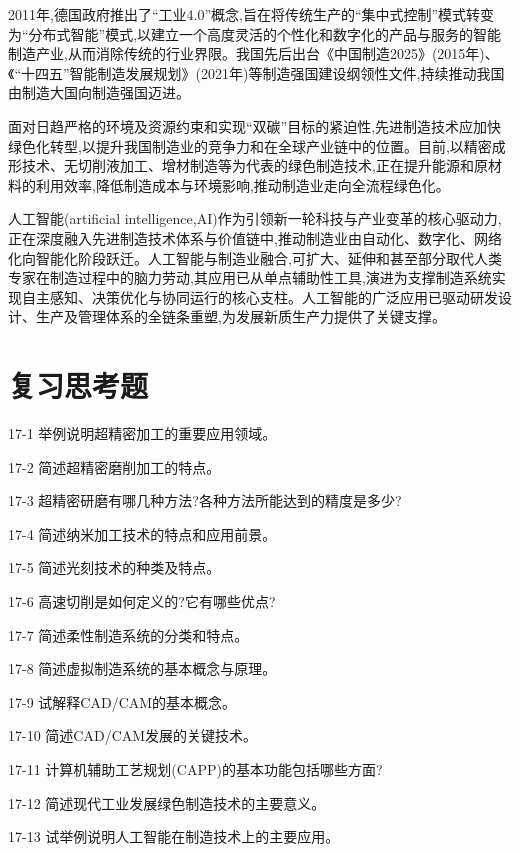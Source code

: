 \documentclass[UTF8]{ctexbook}
\newcommand{\◎}{\ensuremath{\bigcirc}}
\begin{document}
2011年,德国政府推出了“工业4.0”概念,旨在将传统生产的“集中式控制”模式转变为“分布式智能”模式,以建立一个高度灵活的个性化和数字化的产品与服务的智能制造产业,从而消除传统的行业界限。我国先后出台《中国制造2025》(2015年)、《“十四五”智能制造发展规划》(2021年)等制造强国建设纲领性文件,持续推动我国由制造大国向制造强国迈进。

面对日趋严格的环境及资源约束和实现“双碳”目标的紧迫性,先进制造技术应加快绿色化转型,以提升我国制造业的竞争力和在全球产业链中的位置。目前,以精密成形技术、无切削液加工、增材制造等为代表的绿色制造技术,正在提升能源和原材料的利用效率,降低制造成本与环境影响,推动制造业走向全流程绿色化。

人工智能(artificial intelligence,AI)作为引领新一轮科技与产业变革的核心驱动力,正在深度融入先进制造技术体系与价值链中,推动制造业由自动化、数字化、网络化向智能化阶段跃迁。人工智能与制造业融合,可扩大、延伸和甚至部分取代人类专家在制造过程中的脑力劳动,其应用已从单点辅助性工具,演进为支撑制造系统实现自主感知、决策优化与协同运行的核心支柱。人工智能的广泛应用已驱动研发设计、生产及管理体系的全链条重塑,为发展新质生产力提供了关键支撑。

\section*{复习思考题}


17-1 举例说明超精密加工的重要应用领域。

17-2 简述超精密磨削加工的特点。

17-3 超精密研磨有哪几种方法?各种方法所能达到的精度是多少?

17-4 简述纳米加工技术的特点和应用前景。

17-5 简述光刻技术的种类及特点。

17-6 高速切削是如何定义的?它有哪些优点?

17-7 简述柔性制造系统的分类和特点。

17-8 简述虚拟制造系统的基本概念与原理。

17-9 试解释CAD/CAM的基本概念。

17-10 简述CAD/CAM发展的关键技术。

17-11 计算机辅助工艺规划(CAPP)的基本功能包括哪些方面?

17-12 简述现代工业发展绿色制造技术的主要意义。

17-13 试举例说明人工智能在制造技术上的主要应用。
\end{document}

